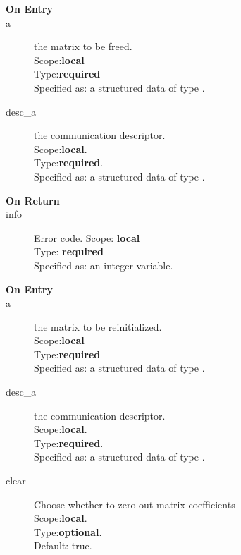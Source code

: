 %
%


\begin{description}
\item[\bf On Entry]
\item[a] the matrix to be freed.\\
Scope:{\bf local}\\
Type:{\bf required}\\
Specified as: a structured data of type \spdata.
\item[desc\_a] the communication descriptor.\\
Scope:{\bf local}.\\
Type:{\bf required}.\\
Specified as: a structured data of type \descdata.
\end{description}

\begin{description}
\item[\bf On Return]
\item[info] Error code.
Scope: {\bf local} \\
Type: {\bf required}\\
Specified as: an integer variable.
\end{description}




%
%


\begin{description}
\item[\bf On Entry]
\item[a] the matrix to be reinitialized.\\
Scope:{\bf local}\\
Type:{\bf required}\\
Specified as: a structured data of type \spdata.
\item[desc\_a] the communication descriptor.\\
Scope:{\bf local}.\\
Type:{\bf required}.\\
Specified as: a structured data of type \descdata.
\item[clear] Choose whether to zero out matrix coefficients\\
Scope:{\bf local}.\\
Type:{\bf optional}.\\
Default: true.
\end{description}

